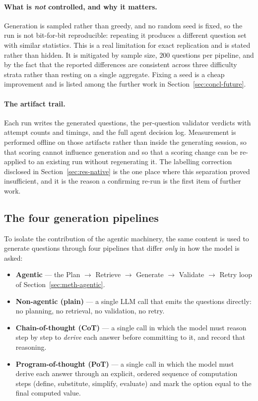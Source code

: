 \paragraph{What is \emph{not} controlled, and why it matters.} Generation is
sampled rather than greedy, and no random seed is fixed, so the run is not
bit-for-bit reproducible: repeating it produces a different question set with
similar statistics. This is a real limitation for exact replication and is
stated rather than hidden. It is mitigated by sample size, $200$ questions per
pipeline, and by the fact that the reported differences are consistent across
three difficulty strata rather than resting on a single aggregate. Fixing a seed
is a cheap improvement and is listed among the further work in
Section~\ref{sec:concl-future}.

\paragraph{The artifact trail.} Each run writes the generated questions, the
per-question validator verdicts with attempt counts and timings, and the full
agent decision log. Measurement is performed offline on those artifacts rather
than inside the generating session, so that scoring cannot influence generation
and so that a scoring change can be re-applied to an existing run without
regenerating it. The labelling correction disclosed in
Section~\ref{sec:res-native} is the one place where this separation proved
insufficient, and it is the reason a confirming re-run is the first item of
further work.

\subsection{The four generation pipelines}
\label{sec:meth-pipelines}

To isolate the contribution of the agentic machinery, the same content is used to
generate questions through four pipelines that differ \emph{only} in how the model
is asked:

\begin{itemize}
  \item \textbf{Agentic} --- the Plan $\rightarrow$ Retrieve $\rightarrow$ Generate
        $\rightarrow$ Validate $\rightarrow$ Retry loop of
        Section~\ref{sec:meth-agentic}.
  \item \textbf{Non-agentic (plain)} --- a single LLM call that emits the questions
        directly: no planning, no retrieval, no validation, no retry.
  \item \textbf{Chain-of-thought (CoT)} --- a single call in which the model must
        reason step by step to \emph{derive} each answer before committing to it,
        and record that reasoning.
  \item \textbf{Program-of-thought (PoT)} --- a single call in which the model must
        derive each answer through an explicit, ordered sequence of computation steps
        (define, substitute, simplify, evaluate) and mark the option equal to the
        final computed value.
\end{itemize}

